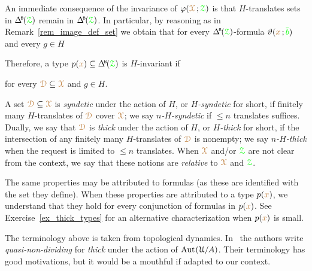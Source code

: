 An immediate consequence of the invariance of $\varphi({\color{brown}\EuScript X}\,;{\color{green}\EuScript Z})$ is that $H$-translates sets in $\BDelta({\grZ})$ remain in $\BDelta({\grZ})$.
In particular, by reasoning as in Remark~\ref{rem_image_def_set} we obtain that for every $\BDelta({\grZ})$-formula $\vartheta({\color{brown} x}\,;{\color{green}\bar b})$ and every $g\in H$


Therefore, a type $p({\mr x})\subseteq\BDelta(\grZ)$ is $H$-invariant if

\hfill for every ${\color{brown}\EuScript D}\subseteq{\color{brown}\EuScript X}$ and $g\in H$.


A set ${\color{brown}\EuScript D}\subseteq{\color{brown}\EuScript X}$ is \emph{syndetic\/} under the action of $H$, or \emph{$H$-syndetic\/} for short, if finitely many $H$-translates of ${\color{brown}\EuScript D}$ cover ${\color{brown}\EuScript X}$; we say \emph{$n$-$H$-syndetic\/} if $\le n$ translates suffices.
Dually, we say that ${\color{brown}\EuScript D}$ is \emph{thick\/} under the action of $H$, or \emph{$H$-thick\/} for short, if the intersection of any finitely many $H$-translates of ${\color{brown}\EuScript D}$ is nonempty; we say \emph{$n$-$H$-thick\/} when the request is limited to $\le n$ translates.
When ${\color{brown}\EuScript X}$ and/or ${\color{green}\EuScript Z}$ are not clear from the context, we say that these notions are \emph{relative\/} to ${\color{brown}\EuScript X}$ and ${\color{green}\EuScript Z}$.

The same properties may be attributed to formulas (as these are identified with the set they define).
When these properties are attributed to a type $p({\color{brown} x})$, we understand that they hold for every conjunction of formulas in $p({\color{brown} x})$.
See Exercise~\ref{ex_thick_types} for an alternative characterization when $p({\color{brown} x})$ is small.

\noindent\llap{\textcolor{red}{\Large\warning}\kern1.5ex}\ignorespaces
The terminology above is taken from topological dynamics.
In~\cite{CK} the authors write \textit{quasi-non-dividing\/} for \textit{thick\/} under the action of ${\rm Aut\kern.15ex}(\EuScript U/A)$.
Their terminology has good motivations, but it would be a mouthful if adapted to our context. 

